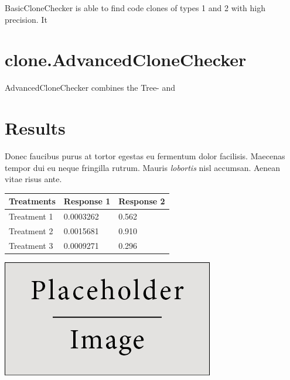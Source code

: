 \documentclass[a0,portrait]{a0poster}
\begin{document}
\begin{multicols}{2}
BasicCloneChecker is able to find code clones of types 1 and 2 with high precision. It 


\section*{clone.AdvancedCloneChecker}

AdvancedCloneChecker combines the Tree- and 


\section*{Results}

Donec faucibus purus at tortor egestas eu fermentum dolor facilisis. Maecenas tempor dui eu neque fringilla rutrum. Mauris \emph{lobortis} nisl accumsan. Aenean vitae risus ante.
%
\begin{table} %
\begin{tabular}{l l l}
\toprule
\textbf{Treatments} & \textbf{Response 1} & \textbf{Response 2}\\
\midrule
Treatment 1 & 0.0003262 & 0.562 \\
Treatment 2 & 0.0015681 & 0.910 \\
Treatment 3 & 0.0009271 & 0.296 \\
\bottomrule
\end{tabular}
\end{table}


\begin{center}\vspace{1cm}
\includegraphics[width=0.8\linewidth]{placeholder}
\end{center}\vspace{1cm}


\end{multicols}
\end{document}
